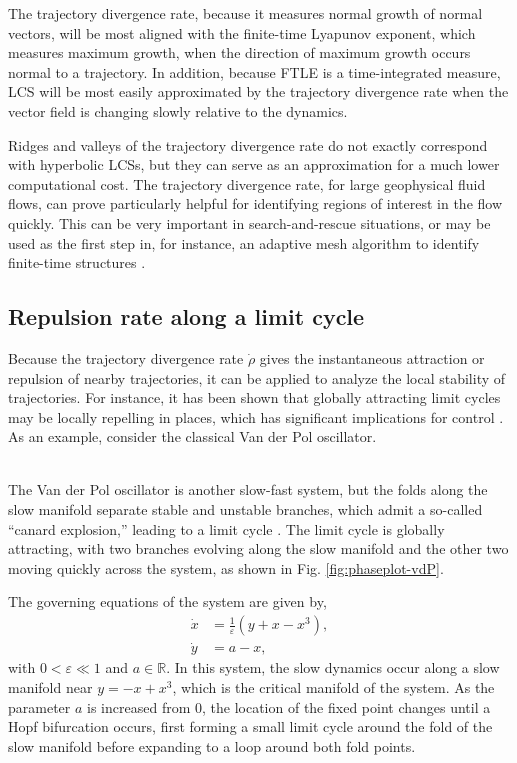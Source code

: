 \documentclass[twocolumn]{svjour3}
\begin{document}
The trajectory divergence rate, because it measures normal growth of normal vectors, will be most aligned with the finite-time Lyapunov exponent, which measures maximum growth, when the direction of maximum growth occurs normal to a trajectory. In addition, because FTLE is a time-integrated measure, LCS will be most easily approximated by the trajectory divergence rate when the vector field is changing slowly relative to the dynamics.

Ridges and valleys of the trajectory divergence rate do not exactly correspond with hyperbolic LCSs, but they can serve as an approximation for a much lower computational cost. The trajectory divergence rate, for large geophysical fluid flows, can prove particularly helpful for identifying regions of interest in the flow quickly. This can be very important in search-and-rescue situations, or may be used as the first step in, for instance, an adaptive mesh algorithm to identify finite-time structures \cite{lekien2010computation,xie2018lagrangian}.

\subsection{Repulsion rate along a limit cycle}
Because the trajectory divergence rate $\dot{\rho}$ gives the instantaneous attraction or repulsion of nearby trajectories, it can be applied to analyze the local stability of trajectories. For instance, it has been shown that globally attracting limit cycles may be locally repelling in places, which has significant implications for control \cite{ali1999local,norris2008revisiting}. As an example, consider the classical Van der Pol oscillator.

 \\
The Van der Pol oscillator is another slow-fast system, but the folds along the slow manifold separate stable and unstable branches, which admit a so-called ``canard explosion,'' leading to a limit cycle \cite{krupa2001relaxation,kuehn2016multiple}. The limit cycle is globally attracting, with two branches evolving along the slow manifold and the other two moving quickly across the system, as shown in Fig. \ref{fig:phaseplot-vdP}.

The governing equations of the system are given by,
\begin{equation}
\begin{aligned}
\dot{x} & = \frac{1}{\varepsilon} \left(y + x - x^3\right), \\
\dot{y} & = a - x,
\end{aligned}
\label{eq: vanderPol}
\end{equation}
with $0<\varepsilon\ll1$ and $a\in\mathbb{R}$. In this system, the slow dynamics occur along a slow manifold near $y=-x+x^3$, which is the critical manifold of the system. As the parameter $a$ is increased from $0$, the location of the fixed point changes until a Hopf bifurcation occurs, first forming a small limit cycle around the fold of the slow manifold before expanding to a loop around both fold points.
\end{document}
